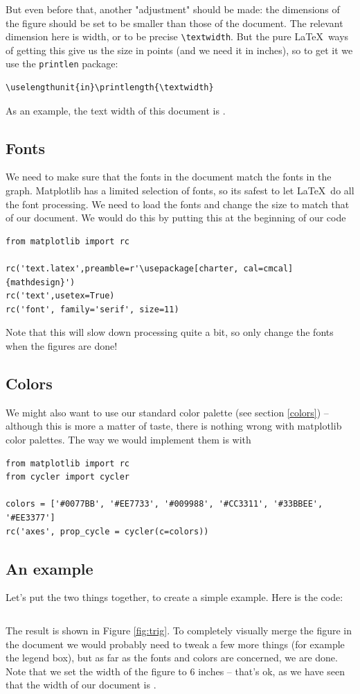 \documentclass[letterpaper,11pt]{notes}
\theoremstyle{definition}
\theoremstyle{plain}
\theoremstyle{remark}
\begin{document}
But even before that, another "adjustment" should be made: the dimensions of the figure should be set to be smaller than those of the document. The relevant dimension here is width, or to be precise \texttt{\textbackslash{}textwidth}. But the pure \LaTeX\ ways of getting this give us the size in points (and we need it in inches), so to get it we use the \texttt{printlen} package:
\begin{verbatim}
\uselengthunit{in}\printlength{\textwidth}
\end{verbatim}
As an example, the text width of this document is \printlength{\textwidth}.



\subsection{Fonts}

We need to make sure that the fonts in the document match the fonts in the graph. Matplotlib has a limited selection of fonts, so its safest to let \LaTeX\ do all the font processing. We need to load the fonts and change the size to match that of our document. We would do this by putting this at the beginning of our code
\begin{verbatim}
from matplotlib import rc

rc('text.latex',preamble=r'\usepackage[charter, cal=cmcal]{mathdesign}')
rc('text',usetex=True)
rc('font', family='serif', size=11)
\end{verbatim}

Note that this will slow down processing quite a bit, so \alert{only change the fonts when the figures are done!}

\subsection{Colors}

We might also want to use our standard color palette (see section \ref{colors}) -- although this is more a matter of taste, there is nothing wrong with matplotlib color palettes. The way we would implement them is with
\begin{verbatim}
from matplotlib import rc
from cycler import cycler

colors = ['#0077BB', '#EE7733', '#009988', '#CC3311', '#33BBEE', '#EE3377']
rc('axes', prop_cycle = cycler(c=colors))
\end{verbatim}


\subsection{An example}
Let's put the two things together, to create a simple example. Here is the code:
\inputminted[linenos]{python}{fig.py}%
The result is shown in Figure \ref{fig:trig}. To completely visually merge the figure in the document we would probably need to tweak a few more things (for example the legend box), but as far as the fonts and colors are concerned, we are done. Note that we set the width of the figure to 6 inches -- that's ok, as we have seen that the width of our document is \printlength{\textwidth}. 
\end{document}
